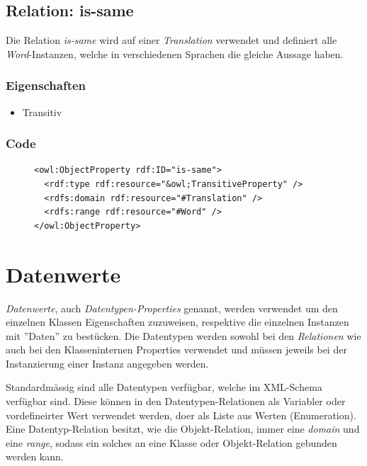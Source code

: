 \documentclass[
    11pt,
    latin1,
    a4paper,
    oneside
]{scrreprt}
\begin{document}
\subsection{Relation: is-same} \label{sec:rel_issame}

Die Relation \emph{is-same} wird auf einer \emph{Translation} verwendet und definiert alle \emph{Word}-Instanzen, welche in verschiedenen Sprachen die gleiche Aussage haben.

\subsubsection{Eigenschaften} \label{sec:rel_issame_settings}

\begin{itemize}
  \item Transitiv
\end{itemize}

\subsubsection{Code} \label{sec:rel_issame_code}

\begin{figure}[H]
 \lstset{language=XML}
 \begin{lstlisting}[label=owl:issame,caption={Die Relation \emph{is-same} definiert auf \emph{Translation}-Instanzen alle W\"orter}]
<owl:ObjectProperty rdf:ID="is-same">
  <rdf:type rdf:resource="&owl;TransitiveProperty" />
  <rdfs:domain rdf:resource="#Translation" />
  <rdfs:range rdf:resource="#Word" />
</owl:ObjectProperty>
 \end{lstlisting}
\end{figure}


\section{Datenwerte} \label{sec:datatypes}

\emph{Datenwerte}, auch \emph{Datentypen-Properties} genannt, werden verwendet um den einzelnen Klassen Eigenschaften zuzuweisen, respektive die einzelnen Instanzen mit ''Daten'' zu best\"ucken. Die Datentypen werden sowohl bei den \emph{Relationen} wie auch bei den Klasseninternen Properties verwendet und m\"ussen jeweils bei der Instanzierung einer Instanz angegeben werden.

Standardm\"assig sind alle Datentypen verf\"ugbar, welche im XML-Schema\cite{XMLSCHEMA} verf\"ugbar sind. Diese k\"onnen in den Datentypen-Relationen als Variabler oder vordefineirter Wert verwendet werden, doer als Liste aus Werten (Enumeration). Eine Datentyp-Relation besitzt, wie die Objekt-Relation, immer eine \emph{domain} und eine \emph{range}, sodass ein solches an eine Klasse oder Objekt-Relation gebunden werden kann.
\end{document}
